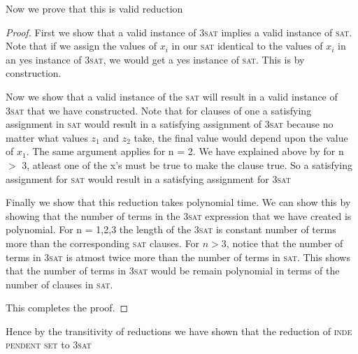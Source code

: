 \documentclass[11pt]{article}
\begin{document}
Now we prove that this is valid reduction
\begin{proof}
First we show that a valid instance of \textsc{3sat} implies a valid instance of \textsc{sat}. Note that if we assign the values of $x_i$ in our \textsc{sat} identical to the values of $x_i$ in an yes instance of \textsc{3sat}, we would get a yes instance of \textsc{sat}. This is by construction.

Now we show that a valid instance of the \textsc{sat} will result in a valid instance of \textsc{3sat} that we have constructed. Note that for clauses of one a satisfying assignment in \textsc{sat} would result in a satisfying assignment of \textsc{3sat} because no matter what values $z_1$ and $z_2$ take, the final value would depend upon the value of $x_1$. The same argument applies for n = 2. We have explained above by for n $>$ 3, atleast one of the x's must be true to make the clause true. So a satisfying assignment for \textsc{sat} would result in a satisfying assignment for \textsc{3sat}

Finally we show that this reduction takes polynomial time. We can show this by showing that the number of terms in the \textsc{3sat} expression that we have created is polynomial. For n = 1,2,3 the length of the \textsc{3sat} is constant number of terms more than the corresponding \textsc{sat} clauses. For $n > 3$, notice that the number of terms in \textsc{3sat} is atmost twice more than the number of terms in \textsc{sat}. This shows that the number of terms in \textsc{3sat} would be remain polynomial in terms of the number of clauses in \textsc{sat}.

This completes the proof.
\end{proof}

Hence by the transitivity of reductions we have shown that the reduction of \textsc{inde  pendent set} to \textsc{3sat}
\end{document}
